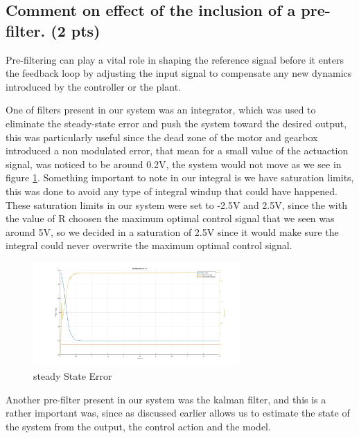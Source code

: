 \subsection{Comment on effect of the inclusion of a pre-filter. (2 pts)}
\vspace{10pt}


Pre-filtering can play a vital role in shaping the reference signal before it enters the feedback loop by adjusting the input signal to compensate any new dynamics introduced by the controller or the plant. 

One of filters present in our system was an integrator, which was used to eliminate the steady-state error and push the system toward the desired output, this was particularly useful since the dead zone of the motor and gearbox introduced a non modulated error, that mean for a small value of the actuaction signal, was noticed to be around 0.2V,  the system would not move as we see in figure \ref{fig: Steady state error}. Something important to note in our integral is we have saturation limits, this was done to avoid any type of integral windup that could have happened. These saturation limits in our system were set to -2.5V and 2.5V, since the with the value of R choosen the maximum optimal control signal that we seen was around 5V, so we decided in a saturation of 2.5V since it would make sure the integral could never overwrite the maximum optimal control signal.  

\begin{figure}[H]
    \centering
    \includegraphics[width=0.7\textwidth]{Figs/steadyStateError.jpg}
    \caption{steady State Error}
    \label{fig: Steady state error}
\end{figure}

Another pre-filter present in our system was the kalman filter, and this is a rather important was, since as discussed earlier allows us to estimate the state of the system from the output, the control action and the model. 